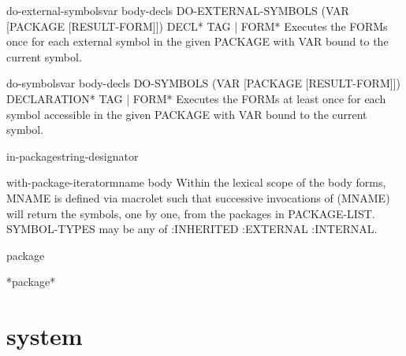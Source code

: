 \begin{macro}{do-external-symbols}{var \body body-decls}{}{}
  DO-EXTERNAL-SYMBOLS (VAR [PACKAGE [RESULT-FORM]]) {DECL}* {TAG | FORM}*
   Executes the FORMs once for each external symbol in the given PACKAGE with
   VAR bound to the current symbol.
\end{macro}

\begin{macro}{do-symbols}{var \body body-decls}{}{}
  DO-SYMBOLS (VAR [PACKAGE [RESULT-FORM]]) {DECLARATION}* {TAG | FORM}*
   Executes the FORMs at least once for each symbol accessible in the given
   PACKAGE with VAR bound to the current symbol.
\end{macro}

\begin{macro}{in-package}{string-designator}{}{}
  
\end{macro}

\begin{macro}{with-package-iterator}{mname \body body}{}{}
  Within the lexical scope of the body forms, MNAME is defined via macrolet
such that successive invocations of (MNAME) will return the symbols, one by
one, from the packages in PACKAGE-LIST. SYMBOL-TYPES may be any
of :INHERITED :EXTERNAL :INTERNAL.
\end{macro}

\begin{class}{package}{}{}{}
  
\end{class}

\begin{variable}{*package*}{}{}{}
  
\end{variable}

\section{system}

